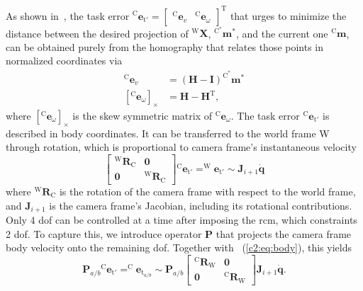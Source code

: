 As shown in~\cite{benhimane2006homography}, the task error $^\text{C}\mathbf{e}_{\text{t}'} = \begin{bmatrix}^\text{C}\mathbf{e}_v & ^\text{C}\mathbf{e}_\omega\end{bmatrix}^\text{T}$ that urges to minimize the distance between the desired projection of $^\text{W}\mathbf{X}$, $^{\text{C}^*}\mathbf{m}^*$, and the current one $^\text{C}\mathbf{m}$, can be obtained purely from the homography that relates those points in normalized coordinates via
\begin{equation}
    \begin{split}
        ^\text{C}\mathbf{e}_v & = (\mathbf{H} - \mathbf{I})^{\text{C}^*}\mathbf{m}^*\\
        \left[^\text{C}\mathbf{e}_\omega\right]_\times & = \mathbf{H} - \mathbf{H}^\text{T},
    \end{split}
    \label{c2:eq:dc}
\end{equation}
where $\left[^\text{C}\mathbf{e}_\omega\right]_\times$ is the skew symmetric matrix of $^\text{C}\mathbf{e}_\omega$. The task error $^\text{C}\mathbf{e}_{\text{t}'}$ is described in body coordinates. It can be transferred to the world frame W through rotation, which is proportional to camera frame's instantaneous velocity
\begin{equation}
    \begin{bmatrix}^\text{W}\mathbf{R}_\text{C} & \mathbf{0} \\ \mathbf{0} & ^\text{W}\mathbf{R}_\text{C}\end{bmatrix}{^\text{C}\mathbf{e}_{\text{t}'}} = ^\text{W}\mathbf{e}_{\text{t}'} \sim \mathbf{J}_{i+1}\dot{\mathbf{q}}
    \label{c2:eq:body}
\end{equation}
where $^\text{W}\mathbf{R}_\text{C}$ is the rotation of the camera frame with respect to the world frame, and $\mathbf{J}_{i+1}$ is the camera frame's Jacobian, including its rotational contributions. Only 4 \acrshort{dof} can be controlled at a time after imposing the \acrshort{rcm}, which constraints 2 \acrshort{dof}. To capture this, we introduce operator $\mathbf{P}$ that projects the camera frame body velocity onto the remaining \acrshort{dof}. Together with \ (\eqref{c2:eq:body}), this yields
\begin{equation}
    \mathbf{P}_{a/b}{^\text{C}\mathbf{e}_{\text{t}'}} = ^\text{C}\mathbf{e}_{\text{t}_{a/b}} \sim \mathbf{P}_{a/b} \begin{bmatrix}^\text{C}\mathbf{R}_\text{W} & \mathbf{0} \\ \mathbf{0} & ^\text{C}\mathbf{R}_\text{W}\end{bmatrix}\mathbf{J}_{i+1}\dot{\mathbf{q}}.
    \label{c2:eq:proj}
\end{equation}
